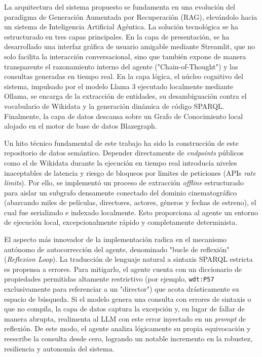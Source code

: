 La arquitectura del sistema propuesto se fundamenta en una evolución del paradigma de Generación Aumentada por Recuperación (RAG), elevándolo hacia un sistema de Inteligencia Artificial Agéntica. La solución tecnológica se ha estructurado en tres capas principales. En la capa de presentación, se ha desarrollado una interfaz gráfica de usuario amigable mediante Streamlit, que no solo facilita la interacción conversacional, sino que también expone de manera transparente el razonamiento interno del agente ("Chain-of-Thought") y las consultas generadas en tiempo real. En la capa lógica, el núcleo cognitivo del sistema, impulsado por el modelo Llama 3 ejecutado localmente mediante Ollama, se encarga de la extracción de entidades, su desambiguación contra el vocabulario de Wikidata y la generación dinámica de código SPARQL. Finalmente, la capa de datos descansa sobre un Grafo de Conocimiento local alojado en el motor de base de datos Blazegraph.

Un hito técnico fundamental de este trabajo ha sido la construcción de este repositorio de datos semántico. Depender directamente de \textit{endpoints} públicos como el de Wikidata durante la ejecución en tiempo real introducía niveles inaceptables de latencia y riesgo de bloqueos por límites de peticiones (APIs \textit{rate limits}). Por ello, se implementó un proceso de extracción \textit{offline} estructurado para aislar un subgrafo densamente conectado del dominio cinematográfico (abarcando miles de películas, directores, actores, géneros y fechas de estreno), el cual fue serializado e indexado localmente. Esto proporciona al agente un entorno de ejecución local, excepcionalmente rápido y completamente determinista.

El aspecto más innovador de la implementación radica en el mecanismo autónomo de autocorrección del agente, denominado "bucle de reflexión" (\textit{Reflexion Loop}). La traducción de lenguaje natural a sintaxis SPARQL estricta es propensa a errores. Para mitigarlo, el agente cuenta con un diccionario de propiedades permitidas altamente restrictivo (por ejemplo, \texttt{wdt:P57} exclusivamente para referenciar a un "director") que acota drásticamente su espacio de búsqueda. Si el modelo genera una consulta con errores de sintaxis o que no compila, la capa de datos captura la excepción y, en lugar de fallar de manera abrupta, realimenta al LLM con este error inyectado en un \textit{prompt} de reflexión. De este modo, el agente analiza lógicamente su propia equivocación y reescribe la consulta desde cero, logrando un notable incremento en la robustez, resiliencia y autonomía del sistema.

